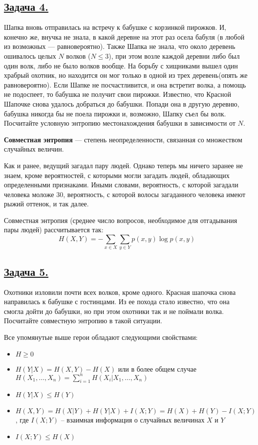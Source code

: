 \subsection*{\hyperref[sec:sol_problem4]{Задача 4.}}\label{sec:problem4} Шапка вновь отправилась на встречу к бабушке с корзинкой пирожков. И, конечно же, внучка не знала, в какой деревне на этот раз осела бабуля (в любой из возможных --- равновероятно). Также Шапка не знала, что около деревень ошивалось целых $N$ волков ($N\leqslant3$), при этом возле каждой деревни либо был один волк, либо не было волков вообще. На борьбу с хищниками вышел один храбрый охотник, но находится он мог только в одной из трех деревень(опять же равновероятно). Если Шапке не посчастливится, и она встретит волка, а помощь не подоспеет, то бабушка не получит свои пирожки. Известно, что Красной Шапочке снова удалось добраться до бабушки. Попади она в другую деревню, бабушка никогда бы не поела пирожки и, возможно, Шапку съел бы волк. Посчитайте условную энтропию местонахождения бабушки в зависимости от $N$. 

\begin{siderules}
    \textbf{Совместная энтропия} --- степень неопределенности, связанная со множеством случайных величин.
\end{siderules}

Как и ранее, ведущий загадал пару людей. Однако теперь мы ничего заранее не знаем, кроме вероятностей, с которыми могли загадать людей, обладающих определенными признаками. Иными словами, вероятность, с которой загадали человека моложе 30, вероятность, с которой волосы загаданного человека имеют рыжий оттенок, и так далее.

Совместная энтропия (среднее число вопросов, необходимое для отгадывания пары людей) рассчитывается так:
\[H(X, Y)=-\sum\limits_{x\in X}\sum\limits_{y\in Y} p(x, y)\log p(x ,y) \]

\subsection*{\hyperref[sec:sol_problem5]{Задача 5.}}\label{sec:problem5} Охотники изловили почти всех волков, кроме одного. Красная шапочка снова направилась к бабушке с гостинцами. Из ее похода стало известно, что она смогла дойти до бабушки, но при этом охотники так и не поймали волка. Посчитайте совместную энтропию в такой ситуации. 

Все упомянутые выше герои обладают следующими свойствами:

\begin{itemize}
    \item $H \geqslant 0$
    \item $H(Y|X)=H(X, Y)-H(X)$ или в более общем случае $H(X_1, \ldots, X_n)=\sum\limits_{i=1}^n H(X_i|X_1, \ldots, X_n)$
    \item $H(Y|X)\leqslant H(Y)$
    \item $H(X, Y)=H(X|Y)+H(Y|X)+I(X; Y)=H(X)+H(Y)-I(X; Y)$, где $I(X; Y)$ -- взаимная информация о случайных величинах $X$ и $Y$
    \item $I(X; Y)\leqslant H(X)$
\end{itemize}

